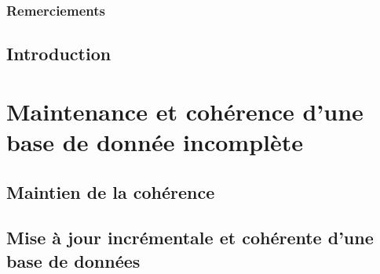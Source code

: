 \pagestyle{fancy}


\frontmatter
\section*{Remerciements}
\lipsum[17-19]

\vfill

\doclicenseThis

\newpage

\dominitoc
\tableofcontents
{}
\listoffigures
{}
\listoftables

\mainmatter

\chapter{Introduction}



\part{Maintenance et cohérence d'une base de donnée incomplète}
\glsresetall


\chapter{Maintien de la cohérence}
\label{chp:update:intro}
\minitoc


\chapter{Mise à jour incrémentale et cohérente d'une base de données}
\label{chp:update:algos}
\minitoc




